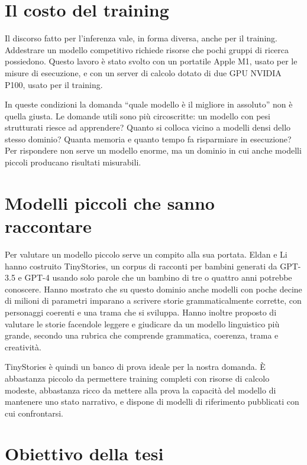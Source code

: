 \section{Il costo del training}

Il discorso fatto per l'inferenza vale, in forma diversa, anche per il training. Addestrare un modello competitivo richiede risorse che pochi gruppi di ricerca possiedono. Questo lavoro è stato svolto con un portatile Apple M1, usato per le misure di esecuzione, e con un server di calcolo dotato di due GPU NVIDIA P100, usato per il training.

In queste condizioni la domanda ``quale modello è il migliore in assoluto'' non è quella giusta. Le domande utili sono più circoscritte: un modello con pesi strutturati riesce ad apprendere? Quanto si colloca vicino a modelli densi dello stesso dominio? Quanta memoria e quanto tempo fa risparmiare in esecuzione? Per rispondere non serve un modello enorme, ma un dominio in cui anche modelli piccoli producano risultati misurabili.

\section{Modelli piccoli che sanno raccontare}

Per valutare un modello piccolo serve un compito alla sua portata. Eldan e Li \cite{eldan2023tinystories} hanno costruito TinyStories, un corpus di racconti per bambini generati da GPT-3.5 e GPT-4 usando solo parole che un bambino di tre o quattro anni potrebbe conoscere. Hanno mostrato che su questo dominio anche modelli con poche decine di milioni di parametri imparano a scrivere storie grammaticalmente corrette, con personaggi coerenti e una trama che si sviluppa. Hanno inoltre proposto di valutare le storie facendole leggere e giudicare da un modello linguistico più grande, secondo una rubrica che comprende grammatica, coerenza, trama e creatività.

TinyStories è quindi un banco di prova ideale per la nostra domanda. È abbastanza piccolo da permettere training completi con risorse di calcolo modeste, abbastanza ricco da mettere alla prova la capacità del modello di mantenere uno stato narrativo, e dispone di modelli di riferimento pubblicati con cui confrontarsi.

\section{Obiettivo della tesi}

